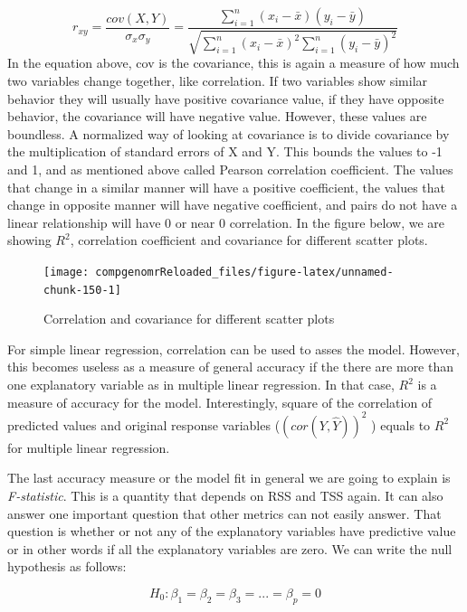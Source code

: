 \documentclass[12pt,]{krantz}
\theoremstyle{definition}
\theoremstyle{definition}
\theoremstyle{definition}
\theoremstyle{remark}
\begin{document}
\[ 
r_{xy}=\frac{cov(X,Y)}{\sigma_x\sigma_y}
      =\frac{\sum\limits_{i=1}^n (x_i-\bar{x})(y_i-\bar{y})}
            {\sqrt{\sum\limits_{i=1}^n (x_i-\bar{x})^2 \sum\limits_{i=1}^n (y_i-\bar{y})^2}}
\] In the equation above, cov is the covariance, this is again a measure
of how much two variables change together, like correlation. If two
variables show similar behavior they will usually have positive
covariance value, if they have opposite behavior, the covariance will
have negative value. However, these values are boundless. A normalized
way of looking at covariance is to divide covariance by the
multiplication of standard errors of X and Y. This bounds the values to
-1 and 1, and as mentioned above called Pearson correlation coefficient.
The values that change in a similar manner will have a positive
coefficient, the values that change in opposite manner will have
negative coefficient, and pairs do not have a linear relationship will
have 0 or near 0 correlation. In the figure below, we are showing
\(R^2\), correlation coefficient and covariance for different scatter
plots.

\begin{figure}

{\centering \texttt{[image: compgenomrReloaded\_files/figure-latex/unnamed-chunk-150-1]} 

}

\caption{Correlation and covariance for different scatter plots}\label{fig:unnamed-chunk-150}
\end{figure}

For simple linear regression, correlation can be used to asses the
model. However, this becomes useless as a measure of general accuracy if
the there are more than one explanatory variable as in multiple linear
regression. In that case, \(R^2\) is a measure of accuracy for the
model. Interestingly, square of the correlation of predicted values and
original response variables (\((cor(Y,\hat{Y}))^2\) ) equals to \(R^2\)
for multiple linear regression.

The last accuracy measure or the model fit in general we are going to
explain is \emph{F-statistic}. This is a quantity that depends on RSS
and TSS again. It can also answer one important question that other
metrics can not easily answer. That question is whether or not any of
the explanatory variables have predictive value or in other words if all
the explanatory variables are zero. We can write the null hypothesis as
follows:

\[H_0: \beta_1=\beta_2=\beta_3=...=\beta_p=0 \]
\end{document}
